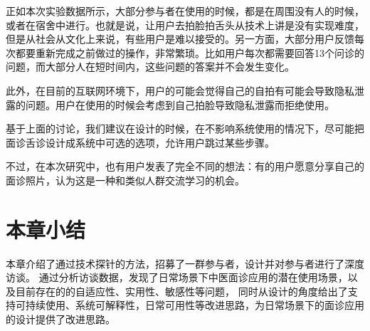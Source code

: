 正如本次实验数据所示，大部分参与者在使用的时候，都是在周围没有人的时候，或者在宿舍中进行。也就是说，让用户去拍脸拍舌头从技术上讲是没有实现难度，但是从社会从文化上来说，有些用户是难以接受的。另一方面，大部分用户反馈每次都要重新完成之前做过的操作，非常繁琐。比如用户每次都需要回答13个问诊的问题，而大部分人在短时间内，这些问题的答案并不会发生变化。

此外，在目前的互联网环境下，用户的可能会觉得自己的自拍有可能会导致隐私泄露的问题。用户在使用的时候会考虑到自己拍脸导致隐私泄露而拒绝使用。

基于上面的讨论，我们建议在设计的时候，在不影响系统使用的情况下，尽可能把面诊舌诊设计成系统中可选的选项，允许用户跳过某些步骤。

不过，在本次研究中，也有用户发表了完全不同的想法：有的用户愿意分享自己的面诊照片，认为这是一种和类似人群交流学习的机会。

\section{本章小结}


本章介绍了通过技术探针的方法，招募了一群参与者，设计并对参与者进行了深度访谈。
通过分析访谈数据，发现了日常场景下中医面诊应用的潜在使用场景，以及目前存在的的自适应性、实用性、敏感性等问题，
同时从设计的角度给出了支持可持续使用、系统可解释性，日常可用性等改进思路，为日常场景下的面诊应用的设计提供了改进思路。


